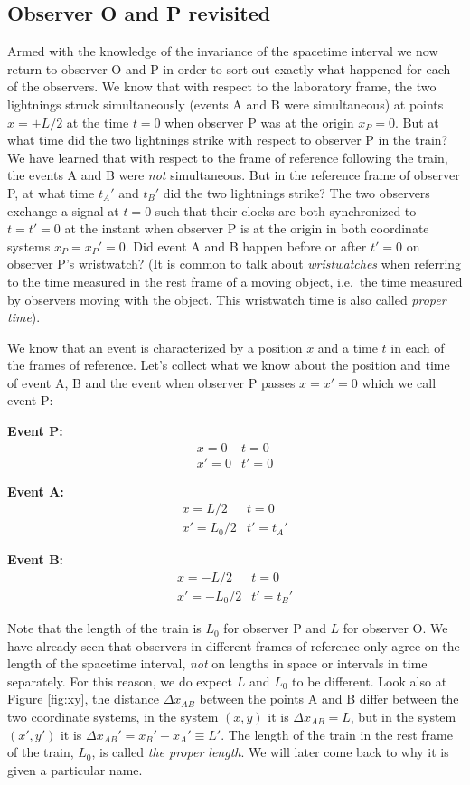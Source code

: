 {\begin{multicols}{2}
\section{Observer O and P revisited}
\label{sect:oandp}

Armed with the knowledge of the invariance of the spacetime interval we now return to observer O and P in order to sort out exactly what happened for each of the observers. We know that with respect to the laboratory frame, the two lightnings struck simultaneously (events A and B were simultaneous) at points $x=\pm L/2$ at the time $t=0$ when observer P was at the origin $x_P=0$. But at what time did the two lightnings strike with respect to observer P in the train? We have learned that with respect to the frame of reference following the train, the events A and B were \emph{not} simultaneous. But in the reference frame of observer P, at what time $t_A'$ and $t_B'$ did the two lightnings strike? The two observers exchange a signal at $t=0$ such that their clocks are both synchronized to $t=t'=0$ at the instant when observer P is at the origin in both coordinate systems $x_P=x_P'=0$. Did event A and B happen before or after $t'=0$ on observer P's wristwatch? (It is common to talk about \emph{wristwatches} when referring to the time measured in the rest frame of a moving object, i.e.\ the time measured by observers moving with the object. This wristwatch time is also called {\it proper time\label{pg:propertime}}).

We know that an event is characterized by a position $x$ and a time $t$ in each of the frames of reference. Let's collect what we know about the position and time of event A, B and the event when observer P passes $x=x'=0$ which we call event P:

{\bf Event P:}
\begin{eqnarray*}
x=0 & t=0\\
x'=0 & t'=0
\end{eqnarray*}

{\bf Event A:}
\begin{eqnarray*}
x=L/2 & t=0\\
x'=L_0/2 & t'=t_A'
\end{eqnarray*}

{\bf Event B:}
\begin{eqnarray*}
x=-L/2 & t=0\\
x'=-L_0/2 & t'=t_B'
\end{eqnarray*}

Note that the length of the train is $L_0$ for observer P and $L$ for observer O. We have already seen that observers in different frames of reference only agree on the length of the spacetime interval, \emph{not} on lengths in space or intervals in time separately. For this reason, we do expect $L$ and $L_0$ to be different. Look also at Figure \ref{fig:xy}, the distance $\Delta x_{AB}$ between the points A and B differ between the two coordinate systems, in the system $(x,y)$ it is $\Delta x_{AB}=L$, but in the system $(x',y')$ it is $\Delta x_{AB}'=x_B'-x_A'\equiv L'$. The length of the train in the rest frame of the train, $L_0$, is called {\it the proper length\label{pg:properlength}}. We will later come back to why it is given a particular name.


\end{multicols}}
